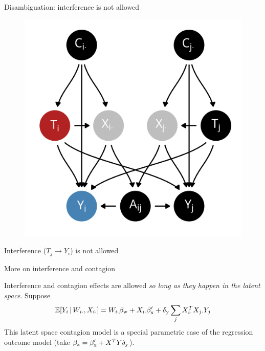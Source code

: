 \documentclass{beamer}
\theoremstyle{remark}
\begin{document}
\begin{frame}{Disambiguation: interference is not allowed}

    \centering

    \begin{figure}
        \includegraphics[scale=0.65]{figures/dags/homophily-mediating-interference-peer.png}
        \label{fig:interference}
    \end{figure}

    Interference ($T_j \to Y_i$) is not allowed

\end{frame}

\begin{frame}{More on interference and contagion}

    Interference and contagion effects are allowed \emph{so long as they happen in the latent space}. Suppose
    \begin{align*}
        \E[\W_{i \cdot}, \X_{i \cdot}]{Y_i}
        = \W_{i \cdot} \betaw + \X_{i \cdot} \beta'_\text{x} + \delta_\text{y} \sum_{j} \X_{i \cdot}^T \X_{j \cdot} Y_j
    \end{align*}
    This latent space contagion model is a special parametric case of the regression outcome model (take $\beta_\text{x} = \beta'_\text{x} + X^T Y \delta_\text{y}$).

\end{frame}
\end{document}
